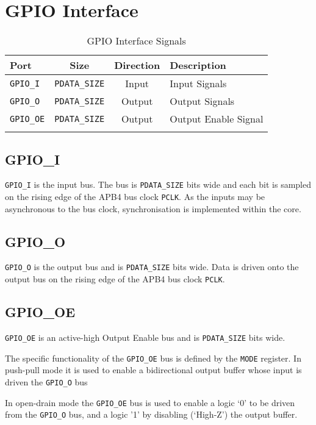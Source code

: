 \section{GPIO Interface}\label{gpio-interface}

\begin{longtable}[]{@{}lccl@{}}
\toprule
Port & Size & Direction & Description\tabularnewline
\midrule
\endhead
\texttt{GPIO\_I} & \texttt{PDATA\_SIZE} & Input & Input Signals\tabularnewline
\texttt{GPIO\_O} & \texttt{PDATA\_SIZE} & Output & Output Signals\tabularnewline
\texttt{GPIO\_OE} & \texttt{PDATA\_SIZE} & Output & Output Enable Signal\tabularnewline
\bottomrule
\caption{GPIO Interface Signals}
\end{longtable}

\subsection{GPIO\_I}\label{gpio_i}

\texttt{GPIO\_I} is the input bus. The bus is \texttt{PDATA\_SIZE} bits wide and each bit
is sampled on the rising edge of the APB4 bus clock \texttt{PCLK}. As the inputs
may be asynchronous to the bus clock, synchronisation is implemented
within the core. 

\subsection{GPIO\_O}\label{gpio_o}

\texttt{GPIO\_O} is the output bus and is \texttt{PDATA\_SIZE} bits wide. Data is driven
onto the output bus on the rising edge of the APB4 bus clock \texttt{PCLK}.

\subsection{GPIO\_OE}\label{gpio_oe}

\texttt{GPIO\_OE} is an active-high Output Enable bus and is \texttt{PDATA\_SIZE} bits
wide.

The specific functionality of the \texttt{GPIO\_OE} bus is defined by the \texttt{MODE}
register. In push-pull mode it is used to enable a bidirectional output
buffer whose input is driven the \texttt{GPIO\_O} bus

In open-drain mode the \texttt{GPIO\_OE} bus is used to enable a logic `0' to be
driven from the \texttt{GPIO\_O} bus, and a logic '1' by disabling (`High-Z') the
output buffer.